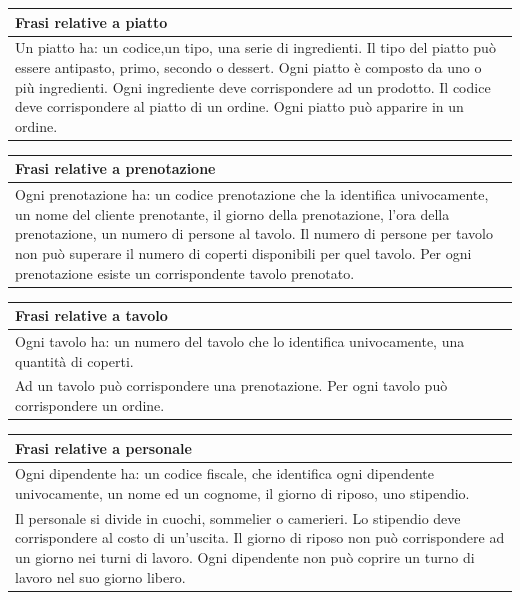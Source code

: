 \begin{longtable}{|p{15.5cm}|}
    \hline
    \textbf{Frasi relative a piatto} \\ \hline
    Un piatto ha: un codice,un tipo, una serie di ingredienti.
Il tipo del piatto può essere antipasto, primo, secondo o dessert.
Ogni piatto è composto da uno o più ingredienti. 
Ogni ingrediente deve corrispondere ad un prodotto. 
Il codice deve corrispondere al piatto di un ordine. 
Ogni piatto può apparire in un ordine.
    \\ \hline
\end{longtable}

\begin{longtable}{|p{15.5cm}|}
    \hline
    \textbf{Frasi relative a prenotazione} \\ \hline
    Ogni prenotazione ha: un codice prenotazione che la identifica univocamente, un nome del cliente prenotante, il giorno della prenotazione, l'ora della prenotazione, un numero di persone al tavolo. 
Il numero di persone per tavolo non può superare il numero di coperti disponibili per quel tavolo. 
Per ogni prenotazione esiste un corrispondente tavolo prenotato.
    \\ \hline
\end{longtable}

\begin{longtable}{|p{15.5cm}|}
    \hline
    \textbf{Frasi relative a tavolo} \\ \hline
    Ogni tavolo ha: un numero del tavolo che lo identifica univocamente, una quantità di coperti. \\
Ad un tavolo può corrispondere una prenotazione. 
Per ogni tavolo può corrispondere un ordine.
    \\ \hline
\end{longtable}

\begin{longtable}{|p{15.5cm}|}
    \hline
    \textbf{Frasi relative a personale} \\ \hline
    Ogni dipendente ha: un codice fiscale, che identifica ogni dipendente univocamente, un nome ed un cognome, il giorno di riposo, uno stipendio. \\
    Il personale si divide in cuochi, sommelier o camerieri.
    Lo stipendio deve corrispondere al costo di un'uscita. 
    Il giorno di riposo non può corrispondere ad un giorno nei turni di lavoro. 
    Ogni dipendente non può coprire un turno di lavoro nel suo giorno libero.
    \\ \hline
\end{longtable}

